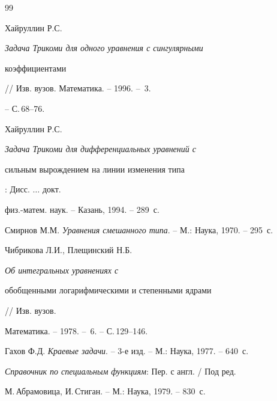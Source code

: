 \begin{thebibliography}{99} 


 




Хайруллин Р.С. {\em Задача Трикоми для одного уравнения с сингулярными 


коэффициентами} // Изв. вузов. Математика. -- 1996. -- \No\,3. 


-- С.\,68--76. 




Хайруллин Р.С. {\em Задача Трикоми для дифференциальных уравнений с 


сильным вырождением на линии изменения типа}: Дисс. $\dotsc$ докт. 


физ.-матем. наук. -- Казань, 1994. -- 289~с. 




Смирнов М.М. {\em Уравнения смешанного типа}. -- М.: Наука, 1970. -- 295~с. 




Чибрикова Л.И., Плещинский Н.Б. {\em Об интегральных уравнениях с 


обобщенными логарифмическими и степенными ядрами} // Изв. вузов. 


Математика. -- 1978. -- \No\,6. -- С.\,129--146. 




Гахов Ф.Д. {\em Краевые задачи}. -- 3-е изд. -- М.: Наука, 1977. -- 640~с. 




{\em Справочник по специальным функциям}: Пер. с англ. / Под ред. 


М.\,Абрамовица, И.\,Стиган. -- М.: Наука, 1979. -- 830~с. 


 


\end{thebibliography} 


 


\vskip 2cm 


 






 


\label{end} 


 


